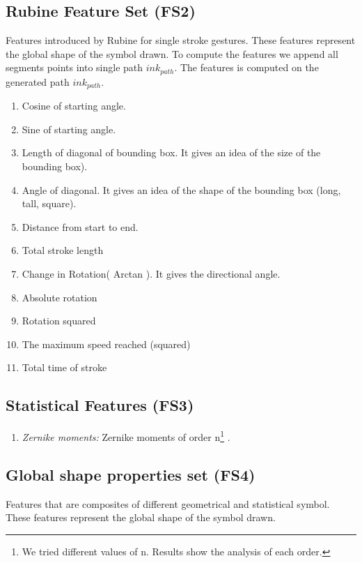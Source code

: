 \subsection{Rubine Feature Set (FS2)} Features introduced by Rubine\cite{gestureexample12} for single stroke gestures. These features represent the global shape of the symbol drawn. To compute the features we append all segments points into single path $ink_{path}$. The features is computed on the generated path $ink_{path}$.%
\begin{enumerate}
	\item Cosine of starting angle.
	\item Sine of starting angle.
	\item Length of diagonal of bounding box. It gives an idea of the size of the bounding box).
	\item Angle of diagonal. It gives an idea of the shape of the bounding box (long, tall, square).
	\item Distance from start to end.  
	\item Total stroke length
	\item Change in Rotation( Arctan ). It gives the directional angle.
	\item Absolute rotation 
	\item Rotation squared 
	\item The maximum speed reached (squared) 
	\item Total time of stroke 
\end{enumerate}
\subsection{Statistical Features (FS3)} 
\begin{enumerate}
	\item \textsl{Zernike moments:} Zernike moments of order n\footnote{ We tried different values of n. Results show the analysis of each order.} \cite{HeloiseBeautification}. 
\end{enumerate}
\subsection{Global shape properties set (FS4)}
 Features that are composites of different geometrical and statistical symbol. These features represent the global shape of the symbol drawn.

